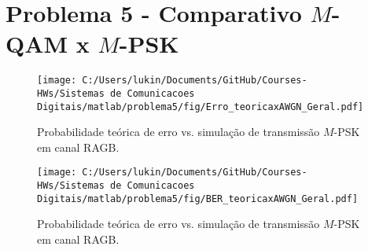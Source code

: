 \section{Problema 5 - Comparativo \texorpdfstring{$M$}{M}-QAM x \texorpdfstring{$M$}{M}-PSK}

\begin{figure}[!ht]
    \centering
    \texttt{[image: C:/Users/lukin/Documents/GitHub/Courses-HWs/Sistemas de Comunicacoes Digitais/matlab/problema5/fig/Erro\_teoricaxAWGN\_Geral.pdf]}
    \caption{Probabilidade teórica de erro vs. simulação de transmissão $M$-PSK em canal RAGB.}
    \label{fig:Erro_teoricaxAWGN_Geral}
\end{figure}

\begin{figure}[!ht]
    \centering
    \texttt{[image: C:/Users/lukin/Documents/GitHub/Courses-HWs/Sistemas de Comunicacoes Digitais/matlab/problema5/fig/BER\_teoricaxAWGN\_Geral.pdf]}
    \caption{Probabilidade teórica de erro vs. simulação de transmissão $M$-PSK em canal RAGB.}
    \label{fig:BER_teoricaxAWGN_Geral}
\end{figure}

